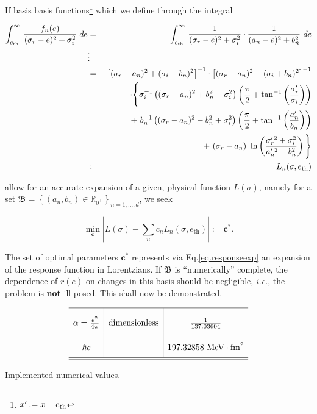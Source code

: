 \documentclass[onecolumn,preprint,superscriptaddress,nofootinbib,notitlepage,10pt,linenumbers]{revtex4-1}
\newcommand*{\mprime}{^{\prime}\mkern-1.2mu}
\newcommand{\ie}{\textit{i.e.}\;}
\newcommand{\be}{\begin{equation}}
\newcommand{\ee}{\end{equation}}
\newcommand{\la}{\label}
\newcommand{\ve}[1]{\ensuremath{\boldsymbol{#1}}}
\begin{document}
If basis basis functions\footnote{$x\mprime:=x-e_\text{th}$} which we define through the integral

\begin{eqnarray*}
\int^\infty_{e_\text{th}}\,\frac{f_n(e)}{(\sigma_r-e)^2+\sigma_i^2}~de
&=&\int_{e_\text{th}}^\infty\,\frac{1}{(\sigma_r-e)^2+\sigma_i^2}\cdot
\frac{1}{(a_n-e)^2+b_n^2}~de\\
&\vdots&\\
&=&\left[(\sigma_r-a_n)^2+(\sigma_i-b_n)^2\right]^{-1}\cdot
\left[(\sigma_r-a_n)^2+(\sigma_i+b_n)^2\right]^{-1}\\
&&\cdot
\Bigg\lbrace
\sigma_i^{-1}\left((\sigma_r-a_n)^2+b_n^2-\sigma_i^2\right)
\left(\frac{\pi}{2}+\tan^{-1}\left(\frac{\sigma_r\mprime}{\sigma_i}\right)\right)\\
&&+~
b_n^{-1}\left((\sigma_r-a_n)^2-b_n^2+\sigma_i^2\right)
\left(\frac{\pi}{2}+\tan^{-1}\left(\frac{a_n\mprime}{b_n}\right)\right)\\&&+~
(\sigma_r-a_n)~\ln\left(\frac{\sigma_r\mprime^2+\sigma_i^2}{a_n\mprime^2+b_n^2}
\right)
\Bigg\rbrace\\
&:=&L_n(\sigma,e_\text{th})
\end{eqnarray*}

allow for an accurate expansion of a given, physical function $L(\sigma)$,
namely for a set $\mathfrak{B}=\left\lbrace (a_n,b_n)\in\mathbb{R}_{0^+}\right\rbrace_{n=1,\ldots,d}$,
we seek

\be
\min_{\ve{c}}\left\vert L(\sigma)-\sum_nc_nL_n(\sigma,e_\text{th})\right\vert:=\ve{c}^*.
\ee

The set of optimal parameters $\ve{c}^*$ represents via Eq.\eqref{eq.responseexp} an expansion
of the response function in Lorentzians.
If $\mathfrak{B}$ is ``numerically'' complete, the dependence of $r(e)$ on changes
in this basis should be negligible, \ie, the problem is {\bf not} ill-posed.
This shall now be demonstrated.

\begin{table}
\be\la{tab.constants}
\renewcommand{\arraystretch}{2.4}
\setlength{\tabcolsep}{8pt}
\begin{array}{c|c|c}\hline
\alpha=\frac{e^2}{4\pi}&\text{dimensionless}&\frac{1}{137.03604}\\
\hbar c & & 197.32858~\text{MeV}\cdot\text{fm}^2 \\
\hline\hline
\end{array}
\ee
\caption{Implemented numerical values.}
\end{table}
\end{document}
